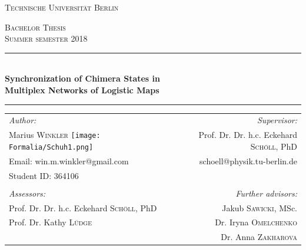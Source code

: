 \thispagestyle{empty}
\begin{titlepage}

\vspace*{0.7cm}

\begin{center}
    {\huge \textsc{Technische Universität Berlin}}
\end{center}

\vspace*{1.5cm}

\begin{center}
    {\LARGE \textsc{Bachelor Thesis}}\\
    \vspace{2mm}
    {\large \textsc{Summer semester 2018}}\\
    \vspace{2.0cm}
    \noindent\rule{15cm}{0.5pt}\\
    \vspace{5mm}
    {\LARGE \textbf{Synchronization of Chimera States in}}\\
    \vspace{2mm}
    {\LARGE \textbf{Multiplex Networks of Logistic Maps}}\\
    \vspace{1mm}
    \noindent\rule{15cm}{0.5pt}
\end{center}

\vspace{2cm}

\begin{center}
\begin{tabular}{ l r }
\textit{Author:} & \textit{Supervisor:}\\[1mm]
\textcolor{vaukgreen}{Marius \scshape{Winkler}} \texttt{[image: Formalia/Schuh1.png]} & Prof. Dr. Dr. h.c. Eckehard {\scshape{Schöll}}, PhD\\
Email: win.m.winkler@gmail.com & schoell@physik.tu-berlin.de\\
Student ID: 364106 &  \\ \\
\textit{Assessors:} & \textit{Further advisors:}\\[1mm]
Prof. Dr. Dr. h.c. Eckehard {\scshape{Schöll}}, PhD & Jakub {\scshape{Sawicki}}, MSc. \\ 
Prof. Dr. Kathy \scshape{Lüdge} & Dr. Iryna \scshape{Omelchenko}\\
 & Dr. Anna \scshape{Zakharova}\\[1mm]


\end{tabular}
\end{center}
\end{titlepage}
